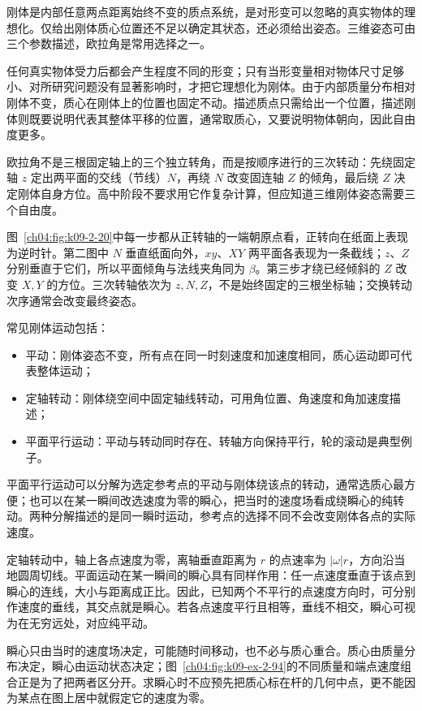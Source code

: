 {刚体是内部任意两点距离始终不变的质点系统，是对形变可以忽略的真实物体的理想化。仅给出刚体质心位置还不足以确定其状态，还必须给出姿态。三维姿态可由三个参数描述，欧拉角是常用选择之一。

任何真实物体受力后都会产生程度不同的形变；只有当形变量相对物体尺寸足够小、对所研究问题没有显著影响时，才把它理想化为刚体。由于内部质量分布相对刚体不变，质心在刚体上的位置也固定不动。描述质点只需给出一个位置，描述刚体则既要说明代表其整体平移的位置，通常取质心，又要说明物体朝向，因此自由度更多。

\EulerStepsDiagram

欧拉角不是三根固定轴上的三个独立转角，而是按顺序进行的三次转动：先绕固定轴 $z$ 定出两平面的交线（节线）$N$，再绕 $N$ 改变固连轴 $Z$ 的倾角，最后绕 $Z$ 决定刚体自身方位。高中阶段不要求用它作复杂计算，但应知道三维刚体姿态需要三个自由度。

图~\ref{ch04:fig:k09-2-20}中每一步都从正转轴的一端朝原点看，正转向在纸面上表现为逆时针。第二图中 $N$ 垂直纸面向外，$xy$、$XY$ 两平面各表现为一条截线；$z$、$Z$ 分别垂直于它们，所以平面倾角与法线夹角同为 $\beta$。第三步才绕已经倾斜的 $Z$ 改变 $X,Y$ 的方位。三次转轴依次为 $z,N,Z$，不是始终固定的三根坐标轴；交换转动次序通常会改变最终姿态。

常见刚体运动包括：

\begin{itemize}
\item 平动：刚体姿态不变，所有点在同一时刻速度和加速度相同，质心运动即可代表整体运动；
\item 定轴转动：刚体绕空间中固定轴线转动，可用角位置、角速度和角加速度描述；
\item 平面平行运动：平动与转动同时存在、转轴方向保持平行，轮的滚动是典型例子。
\end{itemize}

平面平行运动可以分解为选定参考点的平动与刚体绕该点的转动，通常选质心最方便；也可以在某一瞬间改选速度为零的瞬心，把当时的速度场看成绕瞬心的纯转动。两种分解描述的是同一瞬时运动，参考点的选择不同不会改变刚体各点的实际速度。

定轴转动中，轴上各点速度为零，离轴垂直距离为 $r$ 的点速率为 $|\omega|r$，方向沿当地圆周切线。平面运动在某一瞬间的瞬心具有同样作用：任一点速度垂直于该点到瞬心的连线，大小与距离成正比。因此，已知两个不平行的点速度方向时，可分别作速度的垂线，其交点就是瞬心。若各点速度平行且相等，垂线不相交，瞬心可视为在无穷远处，对应纯平动。

瞬心只由当时的速度场决定，可能随时间移动，也不必与质心重合。质心由质量分布决定，瞬心由运动状态决定；图~\ref{ch04:fig:k09-ex-2-94}的不同质量和端点速度组合正是为了把两者区分开。求瞬心时不应预先把质心标在杆的几何中点，更不能因为某点在图上居中就假定它的速度为零。

}

